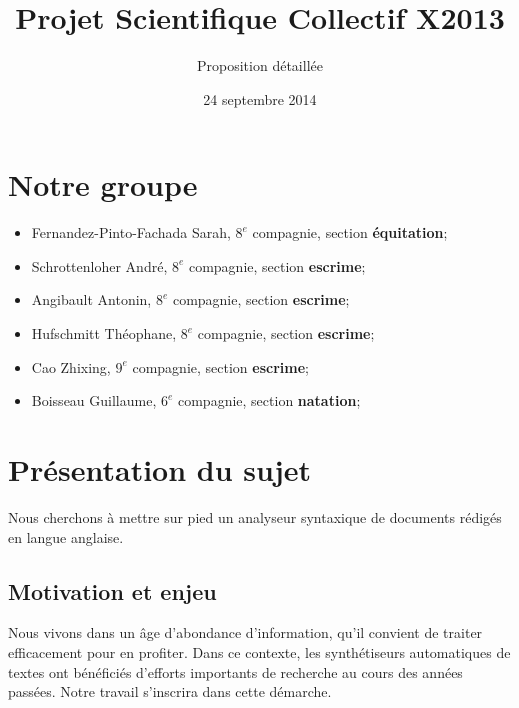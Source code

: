 \documentclass{article}           %
\title{Projet Scientifique Collectif X2013}     %
\author{Proposition détaillée}        %
\date{24 septembre 2014}
\begin{document}

\maketitle                        %


\newpage

\tableofcontents			
\newpage

\section*{Notre groupe}

\begin{itemize}
 \item Fernandez-Pinto-Fachada Sarah, \textbf{$8^e$} compagnie, section \textbf{équitation};
 \item Schrottenloher André, \textbf{$8^e$} compagnie, section \textbf{escrime};
 \item Angibault Antonin, \textbf{$8^e$} compagnie, section \textbf{escrime};
 \item Hufschmitt Théophane, \textbf{$8^e$} compagnie, section \textbf{escrime};
 \item Cao Zhixing, \textbf{$9^e$} compagnie, section \textbf{escrime};
 \item Boisseau Guillaume, \textbf{$6^e$} compagnie, section \textbf{natation};
\end{itemize}


\section{Présentation du sujet} %

Nous cherchons à mettre sur pied un analyseur syntaxique de documents rédigés en langue anglaise.

\subsection{Motivation et enjeu}
Nous vivons dans un \^{a}ge d'abondance d'information, qu'il convient de traiter efficacement pour en profiter. Dans ce contexte, les synthétiseurs automatiques de textes ont bénéficiés d'efforts importants de recherche au cours des années passées. Notre travail s'inscrira dans cette démarche.\cite{elhadad_natural_2010}\\
\end{document}
